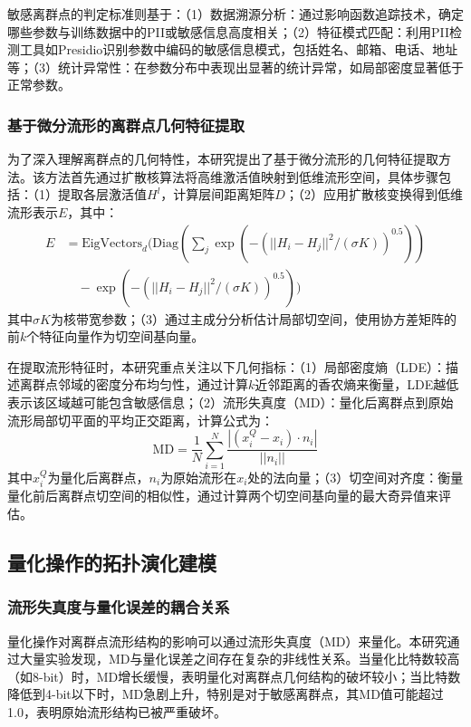 敏感离群点的判定标准则基于：（1）数据溯源分析：通过影响函数追踪技术，确定哪些参数与训练数据中的PII或敏感信息高度相关；（2）特征模式匹配：利用PII检测工具如Presidio识别参数中编码的敏感信息模式，包括姓名、邮箱、电话、地址等；（3）统计异常性：在参数分布中表现出显著的统计异常，如局部密度显著低于正常参数。

\subsubsection{基于微分流形的离群点几何特征提取}

为了深入理解离群点的几何特性，本研究提出了基于微分流形的几何特征提取方法。该方法首先通过扩散核算法将高维激活值映射到低维流形空间，具体步骤包括：（1）提取各层激活值$H^l$，计算层间距离矩阵$D$；（2）应用扩散核变换得到低维流形表示$E$，其中：
\begin{align}
E &= \text{EigVectors}_d(\text{Diag}(\sum_j \exp(-(||H_i-H_j||^2/(\sigma K))^{0.5})) \nonumber \\
&\quad - \exp(-(||H_i-H_j||^2/(\sigma K))^{0.5}))
\end{align}
其中$\sigma K$为核带宽参数；（3）通过主成分分析估计局部切空间，使用协方差矩阵的前$k$个特征向量作为切空间基向量。

在提取流形特征时，本研究重点关注以下几何指标：（1）局部密度熵（LDE）：描述离群点邻域的密度分布均匀性，通过计算$k$近邻距离的香农熵来衡量，LDE越低表示该区域越可能包含敏感信息；（2）流形失真度（MD）：量化后离群点到原始流形局部切平面的平均正交距离，计算公式为：
\begin{equation}
\text{MD} = \frac{1}{N}\sum_{i=1}^N \frac{|(x_i^Q - x_i) \cdot n_i|}{||n_i||}
\end{equation}
其中$x_i^Q$为量化后离群点，$n_i$为原始流形在$x_i$处的法向量；（3）切空间对齐度：衡量量化前后离群点切空间的相似性，通过计算两个切空间基向量的最大奇异值来评估。

\subsection{量化操作的拓扑演化建模}

\subsubsection{流形失真度与量化误差的耦合关系}

量化操作对离群点流形结构的影响可以通过流形失真度（MD）来量化。本研究通过大量实验发现，MD与量化误差之间存在复杂的非线性关系。当量化比特数较高（如8-bit）时，MD增长缓慢，表明量化对离群点几何结构的破坏较小；当比特数降低到4-bit以下时，MD急剧上升，特别是对于敏感离群点，其MD值可能超过1.0，表明原始流形结构已被严重破坏。

